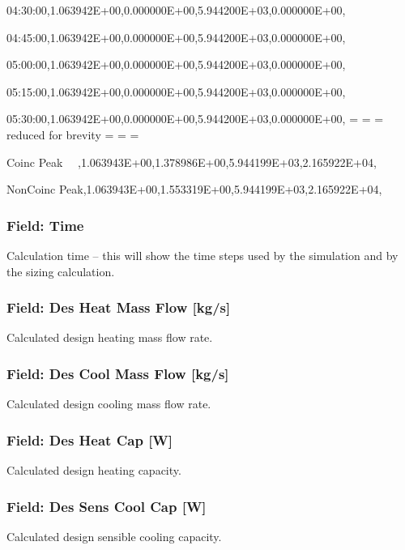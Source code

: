 04:30:00,1.063942E+00,0.000000E+00,5.944200E+03,0.000000E+00,

04:45:00,1.063942E+00,0.000000E+00,5.944200E+03,0.000000E+00,

05:00:00,1.063942E+00,0.000000E+00,5.944200E+03,0.000000E+00,

05:15:00,1.063942E+00,0.000000E+00,5.944200E+03,0.000000E+00,

05:30:00,1.063942E+00,0.000000E+00,5.944200E+03,0.000000E+00, = = = reduced for brevity = = =

Coinc Peak~~ ,1.063943E+00,1.378986E+00,5.944199E+03,2.165922E+04,

NonCoinc Peak,1.063943E+00,1.553319E+00,5.944199E+03,2.165922E+04,

\subsubsection{Field: Time}\label{field-time-20160420}

Calculation time -- this will show the time steps used by the simulation and by the sizing calculation.

\subsubsection{Field: Des Heat Mass Flow {[}kg/s{]}}\label{field-des-heat-mass-flow-kgs}

Calculated design heating mass flow rate.

\subsubsection{Field: Des Cool Mass Flow {[}kg/s{]}}\label{field-des-cool-mass-flow-kgs}

Calculated design cooling mass flow rate.

\subsubsection{Field: Des Heat Cap {[}W{]}}\label{field-des-heat-cap-w}

Calculated design heating capacity.

\subsubsection{Field: Des Sens Cool Cap {[}W{]}}\label{field-des-sens-cool-cap-w}

Calculated design sensible cooling capacity.

